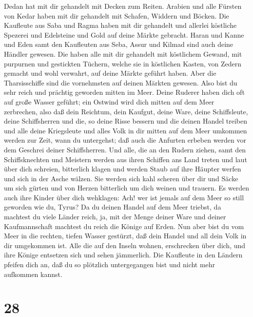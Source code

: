 Dedan hat mit dir gehandelt mit Decken zum Reiten.
 Arabien und alle Fürsten von Kedar haben mit dir gehandelt
mit Schafen, Widdern und Böcken.  Die Kaufleute aus Saba
und Ragma haben mit dir gehandelt und allerlei köstliche Spezerei und
Edelsteine und Gold auf deine Märkte gebracht.  Haran und
Kanne und Eden samt den Kaufleuten aus Seba, Assur und Kilmad sind auch
deine Händler gewesen.  Die haben alle mit dir gehandelt
mit köstlichem Gewand, mit purpurnen und gestickten Tüchern, welche sie
in köstlichen Kasten, von Zedern gemacht und wohl verwahrt, auf deine
Märkte geführt haben.  Aber die Tharsisschiffe sind die
vornehmsten auf deinen Märkten gewesen. Also bist du sehr reich und
prächtig geworden mitten im Meer.  Deine Ruderer haben dich
oft auf große Wasser geführt; ein Ostwind wird dich mitten auf dem Meer
zerbrechen,  also daß dein Reichtum, dein Kaufgut, deine
Ware, deine Schiffsleute, deine Schiffsherren und die, so deine Risse
bessern und die deinen Handel treiben und alle deine Kriegsleute und
alles Volk in dir mitten auf dem Meer umkommen werden zur Zeit, wann du
untergehst;  daß auch die Anfurten erbeben werden vor dem
Geschrei deiner Schiffsherren.  Und alle, die an den Rudern
ziehen, samt den Schiffsknechten und Meistern werden aus ihren Schiffen
ans Land treten  und laut über dich schreien, bitterlich
klagen und werden Staub auf ihre Häupter werfen und sich in der Asche
wälzen.  Sie werden sich kahl scheren über dir und Säcke um
sich gürten und von Herzen bitterlich um dich weinen und trauern.
 Es werden auch ihre Kinder über dich wehklagen: Ach! wer
ist jemals auf dem Meer so still geworden wie du, Tyrus? 
Da du deinen Handel auf dem Meer triebst, da machtest du viele Länder
reich, ja, mit der Menge deiner Ware und deiner Kaufmannschaft machtest
du reich die Könige auf Erden.  Nun aber bist du vom Meer
in die rechten, tiefen Wasser gestürzt, daß dein Handel und all dein
Volk in dir umgekommen ist.  Alle die auf den Inseln
wohnen, erschrecken über dich, und ihre Könige entsetzen sich und sehen
jämmerlich.  Die Kaufleute in den Ländern pfeifen dich an,
daß du so plötzlich untergegangen bist und nicht mehr aufkommen kannst.

\hypertarget{section-27}{%
\section{28}\label{section-27}}

